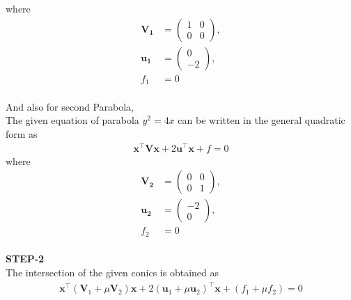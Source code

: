 \documentclass[journal,12pt,twocolumn]{IEEEtran}
\newcommand{\myvec}[1]{\ensuremath{\begin{pmatrix}#1\end{pmatrix}}}
\let\vec\mathbf
\let\vec\mathbf
\providecommand{\brak}[1]{\ensuremath{\left(#1\right)}}
\begin{document}
where
\begin{align}
 \vec{V_1} &= \myvec{1 & 0\\0 & 0},
 \label{eq-2-} 
 \\
 \vec{u_1} &= \myvec{0\\-2},
 \label{eq-3-} 
 \\
 f_1 &= 0
 \label{eq-4-} 
\end{align}
\\
And also for second Parabola,\\
The given equation of parabola $y^2 = 4x$ can be written in the general quadratic form as
\begin{align}
    \label{eq:conic_quad_form}
    \vec{x}^{\top}\vec{V}\vec{x}+2\vec{u}^{\top}\vec{x}+f=0
    \end{align}
where
\begin{align}
 \vec{V_2} &= \myvec{0 & 0\\0 & 1},
 \label{eq-6-} 
 \\
 \vec{u_2} &= \myvec{-2\\ 0},
 \label{eq-7-} 
 \\
 f_2 &= 0
 \label{eq-8-}  
\end{align}
\\
\textbf{STEP-2}\vspace{2mm}\\
The intersection of the given conics is obtained
as\\
\begin{align}
	\vec{x}^{\top}\brak{\vec{V}_1 + \mu\vec{V}_2}\vec{x}+2 \brak{\vec{u}_1+\mu \vec{u}_2}^{\top} \vec{x} 
	+ \brak{f_1+\mu f_2}= 0
	\\
    \end{align}
    
\end{document}
